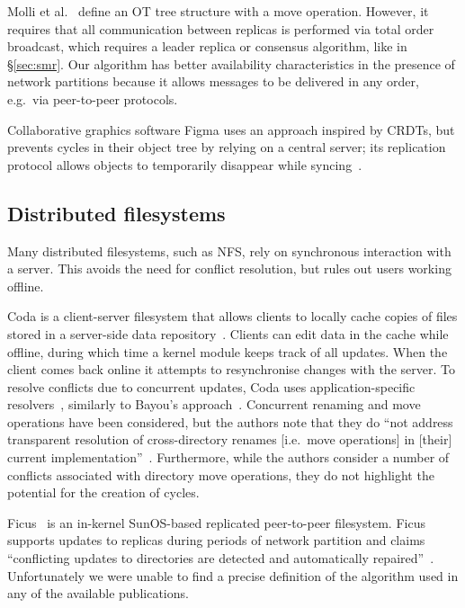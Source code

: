 \documentclass[10pt,journal,compsoc]{IEEEtran}
\begin{document}
Molli et al.~\cite{Molli:2003cd} define an OT tree structure with a move operation.
However, it requires that all communication between replicas is performed via total order broadcast, which requires a leader replica or consensus algorithm, like in \S\ref{sec:smr}.
Our algorithm has better availability characteristics in the presence of network partitions because it allows messages to be delivered in any order, e.g.\ via peer-to-peer protocols.

Collaborative graphics software Figma uses an approach inspired by CRDTs, but prevents cycles in their object tree by relying on a central server; its replication protocol allows objects to temporarily disappear while syncing~\cite{Wallace:2019vf}.

\subsection{Distributed filesystems}\label{sec:filesystems}

Many distributed filesystems, such as NFS, rely on synchronous interaction with a server.
This avoids the need for conflict resolution, but rules out users working offline.

Coda is a client-server filesystem that allows clients to locally cache copies of files stored in a server-side data repository~\cite{kistler1992coda}. 
Clients can edit data in the cache while offline, during which time a kernel module keeps track of all updates. 
When the client comes back online it attempts to resynchronise changes with the server. 
To resolve conflicts due to concurrent updates, Coda uses application-specific resolvers~\cite{Kumar:1995wf}, similarly to Bayou's approach~\cite{Terry:1995dn}.
Concurrent renaming and move operations have been considered, but the authors note that they do ``not address transparent resolution of cross-directory renames [i.e.\ move operations] in [their] current implementation''~\cite{kumar1993log}.
Furthermore, while the authors consider a number of conflicts associated with directory move operations, they do not highlight the potential for the creation of cycles.

Ficus~\cite{Reiher:1994wh} is an in-kernel SunOS-based replicated peer-to-peer filesystem. 
Ficus supports updates to replicas during periods of network partition and claims ``conflicting updates to directories are detected and automatically repaired''~\cite{guy1990implementation}. 
Unfortunately we were unable to find a precise definition of the algorithm used in any of the available publications. 
\end{document}
